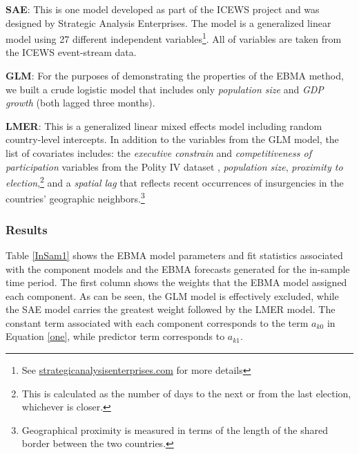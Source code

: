 \documentclass[pdftex,12pt,fullpage,oneside]{amsart}
\begin{document}
\begin{list}{}{\leftmargin=1em}
\item \textbf{SAE}: This is one model developed as part of the ICEWS
  project and was designed by Strategic Analysis Enterprises. The
  model is a generalized linear model using 27 different independent
  variables\footnote{See \url{strategicanalysisenterprises.com} for
    more details}.  All of variables are taken from the ICEWS
  event-stream data.
\item \textbf{GLM}: For the purposes of demonstrating the properties
  of the EBMA method, we built a crude logistic model that includes only
  \textit{population size} and \textit{GDP growth} (both lagged three months).
\item \textbf{LMER}: This is a generalized linear mixed effects model
  including random country-level intercepts. In addition to the
  variables from the GLM model, the list of covariates includes: the
  \textit{executive constrain} and \textit{competitiveness of
    participation} variables from the Polity IV dataset
  \citep{PolityIV}, \textit{population size}, \textit{proximity to
    election},\footnote{This is calculated as the number of days to
    the next or from the last election, whichever is closer.} and a
  \textit{spatial lag} that reflects recent occurrences of
  insurgencies in the countries' geographic
  neighbors.\footnote{Geographical proximity is measured in terms of
    the length of the shared border between the two countries.}
\end{list}



\subsubsection{Results}

Table \ref{InSam1} shows the EBMA model parameters and fit statistics
associated with the component models and the EBMA forecasts generated
for the in-sample time period. The first column shows the weights that
the EBMA model assigned each component. As can be seen, the GLM model
is effectively excluded, while the SAE model carries the greatest
weight followed by the LMER model.  The constant term associated with
each component corresponds to the term $a_{k0}$ in Equation \ref{one},
while predictor term corresponds to $a_{k1}$.
\end{document}
